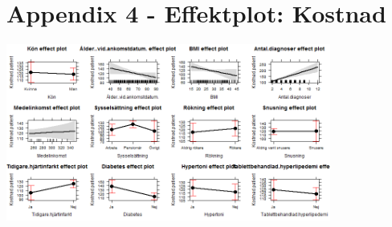 \section{Appendix 4 - Effektplot: Kostnad}
\noindent\begin{minipage}{\textwidth}

\centering
\includegraphics[width=0.8\textwidth]{effektkostnad.png}
\end{minipage} 
\newpage

\restoregeometry


%


